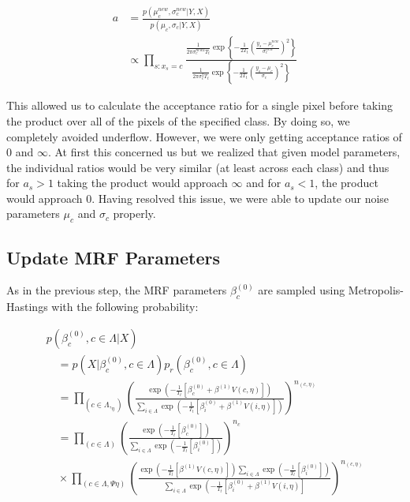 \documentclass[11pt]{article}
\begin{document}
\begin{equation}
\begin{aligned}
a & = \frac{p\left(\mu_{c}^{new}, \sigma_{c}^{new} | Y, X\right)}{p\left(\mu_{c}, \sigma_{c} | Y, X\right)}\\ & \propto \prod_{s: x_{s}=c}  \frac{\frac{1}{2 \pi \sigma_{c}^{new2} T_{t}} \exp \left\{-\frac{1}{2 T_{t}} \left(\frac{y_{s}-\mu_{c}^{new}}{\sigma_{c}^{new}}\right)^{2} \right\}}{\frac{1}{2 \pi \sigma_{c}^{2} T_{t}} \exp \left\{-\frac{1}{2 T_{t}} \left(\frac{y_{s}-\mu_{c}}{\sigma_{c}}\right)^{2} \right\}}
\end{aligned}
\end{equation}

This allowed us to calculate the acceptance ratio for a single pixel before taking the product over all of the pixels of the specified class.
By doing so, we completely avoided underflow. However, we were only getting acceptance ratios of $0$ and $\infty$.
At first this concerned us but we realized that given model parameters, the individual ratios would be very similar (at least across each class) and thus for $a_{s} > 1$ taking the product would approach $\infty$ and for $a_{s} < 1$, the product would approach 0.
Having resolved this issue, we were able to update our noise parameters $\mu_{c}$ and $\sigma_{c}$ properly.

\subsection{Update MRF Parameters}
As in the previous step, the MRF parameters $\beta_{c}^{(0)}$ are sampled using Metropolis-Hastings with the following probability:

\begin{equation}
\begin{array}{l}
p\left(\beta_{c}^{(0)}, c \in \Lambda | X\right) \\
\quad=p\left(X | \beta_{c}^{(0)}, c \in \Lambda\right) p_{r}\left(\beta_{c}^{(0)}, c \in \Lambda\right) \\
\quad=\prod_{\left(c \in \Lambda, _{\eta}\right)}\left(\frac{\exp \left(-\frac{1}{T_{t}}\left[\beta_{c}^{(0)}+\beta^{(1)} V(c, \eta)\right]\right)}{\sum_{i \in \Lambda} \exp \left(-\frac{1}{T_{t}}\left[\beta_{i}^{(0)}+\beta^{(1)} V(i, \eta)\right]\right)}\right)^{n_{(c, \eta)}} \\
\quad=\prod_{(c \in \Lambda)}\left(\frac{\exp \left(-\frac{1}{T_{t}}\left[\beta_{c}^{(0)}\right]\right)}{\sum_{i \in \Lambda} \exp \left(-\frac{1}{T_{t}}\left[\beta_{i}^{(0)}\right]\right)}\right)^{n_{c}} \\
\quad \times \prod_{(c \in \Lambda, \Psi \eta)}\left(\frac{\exp \left(-\frac{1}{T_{t}}\left[\beta^{(1)} V(c, \eta)\right]\right) \sum_{i \in \Lambda} \exp \left(-\frac{1}{T_{t}}\left[\beta_{i}^{(0)}\right]\right)}{\sum_{i \in \Lambda} \exp \left(-\frac{1}{T_{t}}\left[\beta_{i}^{(0)}+\beta^{(1)} V(i, \eta)\right]\right.}\right)^{n_{(c, \eta)}}
\end{array}
\end{equation}
\end{document}
